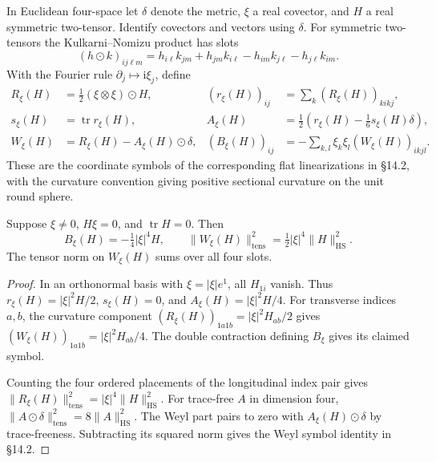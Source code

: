 \begin{definition}
\label{def:flat-curvature-symbols}
In Euclidean four-space let $\delta$ denote the metric, $\xi$ a real
covector, and $H$ a real symmetric two-tensor. Identify covectors and
vectors using $\delta$. For symmetric two-tensors the Kulkarni--Nomizu
product has slots
\[
  (h\odot k)_{ij\ell m}
    =h_{i\ell}k_{jm}+h_{jm}k_{i\ell}-h_{im}k_{j\ell}-h_{j\ell}k_{im}.
\]
With the Fourier rule $\partial_j\mapsto\mathrm{i}\xi_j$, define
\[
\begin{aligned}
  R_\xi(H) &= \tfrac12(\xi\otimes\xi)\odot H,
  & (r_\xi(H))_{ij} &= \sum_k(R_\xi(H))_{kikj},\\
  s_\xi(H) &= \operatorname{tr} r_\xi(H),
  & A_\xi(H) &= \tfrac12\left(r_\xi(H)-\tfrac16 s_\xi(H)\delta\right),\\
  W_\xi(H) &= R_\xi(H)-A_\xi(H)\odot\delta,
  & (B_\xi(H))_{ij} &= -\sum_{k,l}\xi_k\xi_l (W_\xi(H))_{ikjl}.
\end{aligned}
\]
These are the coordinate symbols of the corresponding flat linearizations
in \S14.2, with the curvature convention giving positive sectional
curvature on the unit round sphere.
\end{definition}

\begin{lemma}
\label{lem:flat-weyl-bach}
Suppose $\xi\ne 0$, $H\xi=0$, and $\operatorname{tr}H=0$. Then
\[
  B_\xi(H)=-\tfrac14|\xi|^4H,\qquad
  \lVert W_\xi(H)\rVert_{\mathrm{tens}}^2
    =\tfrac12|\xi|^4\lVert H\rVert_{\mathrm{HS}}^2 .
\]
The tensor norm on $W_\xi(H)$ sums over all four slots.
\end{lemma}

\begin{proof}
In an orthonormal basis with $\xi=|\xi|e^1$, all $H_{1i}$ vanish.
Thus $r_\xi(H)=|\xi|^2H/2$, $s_\xi(H)=0$, and
$A_\xi(H)=|\xi|^2H/4$. For transverse indices $a,b$, the curvature
component $(R_\xi(H))_{1a1b}=|\xi|^2H_{ab}/2$ gives
$(W_\xi(H))_{1a1b}=|\xi|^2H_{ab}/4$. The double contraction defining
$B_\xi$ gives its claimed symbol.

Counting the four ordered placements of the longitudinal index pair
gives $\lVert R_\xi(H)\rVert_{\mathrm{tens}}^2
=|\xi|^4\lVert H\rVert_{\mathrm{HS}}^2$.
For trace-free $A$ in dimension four,
$\lVert A\odot\delta\rVert_{\mathrm{tens}}^2=8\lVert A\rVert_{\mathrm{HS}}^2$.
The Weyl part pairs to zero with $A_\xi(H)\odot\delta$ by trace-freeness.
Subtracting its squared norm gives the Weyl symbol identity in \S14.2.
\end{proof}

